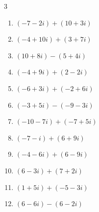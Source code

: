 \begin{multicols}{3}
\begin{enumerate}
        \phantom{$\displaystyle =10-5i$}

  \item $\displaystyle (-7-2i) + (10+3i)$

        \phantom{$\displaystyle =3+i$}

  \item $\displaystyle (-4+10i) + (3+7i)$

        \phantom{$\displaystyle =-1+17i$}

  \item $\displaystyle (10+8i) - (5+4i)$

        \phantom{$\displaystyle =5+4i$}

  \item $\displaystyle (-4+9i) + (2-2i)$

        \phantom{$\displaystyle =-2+7i$}

\columnbreak %

\resetques

  \item $\displaystyle (-6+3i) + (-2+6i)$

        \phantom{$\displaystyle =-8+9i$}

  \item $\displaystyle (-3+5i) - (-9-3i)$

        \phantom{$\displaystyle =6+8i$}

  \item $\displaystyle (-10-7i) + (-7+5i)$

        \phantom{$\displaystyle =-17-2i$}

  \item $\displaystyle (-7-i) + (6+9i)$

        \phantom{$\displaystyle =-1+8i$}

  \item $\displaystyle (-4-6i) + (6-9i)$

        \phantom{$\displaystyle =2-15i$}

  \item $\displaystyle (6-3i) + (7+2i)$

        \phantom{$\displaystyle =13-i$}

  \item $\displaystyle (1+5i) + (-5-3i)$

        \phantom{$\displaystyle =-4+2i$}

  \item $\displaystyle (6-6i) - (6-2i)$

        \phantom{$\displaystyle =-4i$}


\end{enumerate}
\end{multicols}
